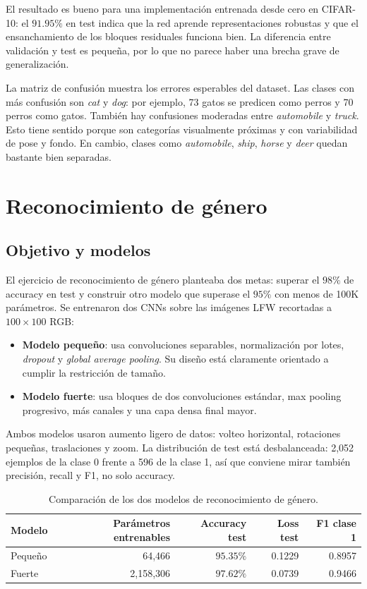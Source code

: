 \documentclass[a4paper,11pt]{article}
\begin{document}
El resultado es bueno para una implementación entrenada desde cero en CIFAR-10: el \(91.95\%\) en test indica que la red aprende representaciones robustas y que el ensanchamiento de los bloques residuales funciona bien. La diferencia entre validación y test es pequeña, por lo que no parece haber una brecha grave de generalización.

La matriz de confusión muestra los errores esperables del dataset. Las clases con más confusión son \textit{cat} y \textit{dog}: por ejemplo, 73 gatos se predicen como perros y 70 perros como gatos. También hay confusiones moderadas entre \textit{automobile} y \textit{truck}. Esto tiene sentido porque son categorías visualmente próximas y con variabilidad de pose y fondo. En cambio, clases como \textit{automobile}, \textit{ship}, \textit{horse} y \textit{deer} quedan bastante bien separadas.

\section{Reconocimiento de género}

\subsection{Objetivo y modelos}

El ejercicio de reconocimiento de género planteaba dos metas: superar el \(98\%\) de accuracy en test y construir otro modelo que superase el \(95\%\) con menos de 100K parámetros. Se entrenaron dos CNNs sobre las imágenes LFW recortadas a \(100\times100\) RGB:

\begin{itemize}
    \item \textbf{Modelo pequeño}: usa convoluciones separables, normalización por lotes, \textit{dropout} y \textit{global average pooling}. Su diseño está claramente orientado a cumplir la restricción de tamaño.
    \item \textbf{Modelo fuerte}: usa bloques de dos convoluciones estándar, max pooling progresivo, más canales y una capa densa final mayor.
\end{itemize}

Ambos modelos usaron aumento ligero de datos: volteo horizontal, rotaciones pequeñas, traslaciones y zoom. La distribución de test está desbalanceada: 2,052 ejemplos de la clase 0 frente a 596 de la clase 1, así que conviene mirar también precisión, recall y F1, no solo accuracy.

\begin{table}[H]
\centering
\begin{tabular}{lrrrr}
\toprule
\textbf{Modelo} & \textbf{Parámetros entrenables} & \textbf{Accuracy test} & \textbf{Loss test} & \textbf{F1 clase 1} \\
\midrule
Pequeño & 64,466 & \(95.35\%\) & 0.1229 & 0.8957 \\
Fuerte & 2,158,306 & \(97.62\%\) & 0.0739 & 0.9466 \\
\bottomrule
\end{tabular}
\caption{Comparación de los dos modelos de reconocimiento de género.}
\end{table}
\end{document}
